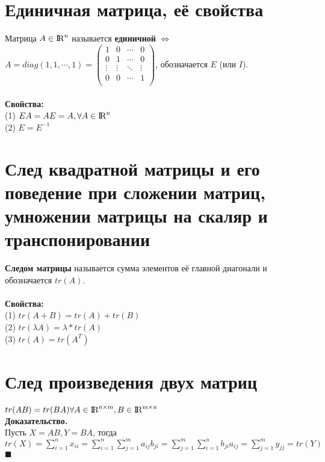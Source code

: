 \documentclass[a4paper,11pt]{report}
\DeclareMathOperator{\real}{\rm I\!R}
\DeclareMathOperator{\Mnm}{\real^{n\times m}}
\DeclareMathOperator{\Mmn}{\real^{m\times n}}
\DeclareMathOperator{\Mn}{{\rm I\!R}^{n}}
\begin{document}
\section{Единичная матрица, её свойства}
Матрица $A \in \Mn$ называется \textbf{единичной} $\Leftrightarrow$ $A = diag(1, 1, \cdots, 1) = 
\begin{pmatrix}
1 & 0 & \cdots & 0\\
0 & 1 & \cdots & 0\\
\vdots & \vdots & \ddots & \vdots\\
0 & 0 & \cdots & 1\\
\end{pmatrix}
$, обозначается $E$ (или $I$).\\
\\
\textbf{Свойства:}\\
(1) $EA = AE = A, \forall A \in \Mn$\\
(2) $E = E^{-1}$\\
\section{След квадратной матрицы и его поведение при сложении матриц, умножении матрицы на скаляр и транспонировании}
\textbf{Следом матрицы} называется сумма элементов её главной диагонали и обозначается $tr(A)$.\\
\\
\textbf{Свойства:}\\
(1) $tr(A + B) = tr(A) + tr(B)$\\
(2) $tr(\lambda{A}) = \lambda * tr(A)$\\
(3) $tr(A) = tr(A^T)$\\
\section{След произведения двух матриц}
$tr(AB) = tr(BA) \forall A \in \Mnm, B \in \Mmn$\\
\textbf{Доказательство.}\\
Пусть $X = AB, Y = BA$, тогда\\
$tr(X) = \sum_{i=1}^{n} x_{ii} = \sum_{i=1}^{n}\sum_{j=1}^{m} a_{ij}b_{ji} = 
\sum_{j=1}^{m}\sum_{i=1}^{n} b_{ji}a_{ij} =\sum_{j=1}^{m} y_{jj} = tr(Y) $ $\blacksquare$\\
\end{document}
